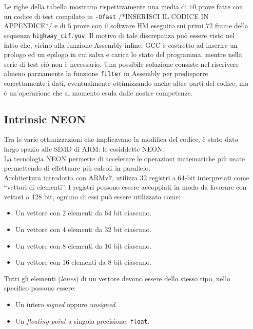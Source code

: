 Le righe della tabella mostrano rispettivamente una media di $10$ prove
fatte con un 
codice di test 
compilato in \verb|-Ofast| /*INSERISCI IL CODICE IN APPENDICE*/ e di $5$ prove 
con il software HM eseguito sui primi $72$ 
frame 
della sequenza \verb|highway_cif.yuv|.\newline
Il motivo di tale discrepanza può essere visto 
nel fatto che, vicino alla funzione Assembly inline, GCC è costretto ad 
inserire un prologo ed un epilogo in cui salva e carica lo stato del programma, 
mentre nella serie di test ciò non è necessario.\newline
Una possibile soluzione consiste nel riscrivere almeno parziamente la funzione 
\verb|filter| 
in Assembly per predisporre correttamente i dati, eventualmente
ottimizzando anche altre parti del codice, ma è un'operazione che al momento 
esula dalle nostre competenze.


\subsection{Intrinsic NEON}

Tra le varie ottimizzazioni che implicavano la modifica del codice, è stato 
dato largo spazio alle SIMD di ARM: le cosiddette NEON.\\
La tecnologia NEON permette di accelerare le operazioni matematiche più usate 
permettendo di effettuare più calcoli in parallelo.\\
Architettura introdotta con ARMv7, utilizza 32 registri a 64-bit interpretati 
come ``vettori di elementi''. I registri possono essere accoppiati in modo da 
lavorare con vettori a 128 bit, ognuno di essi può essere utilizzato come:

\begin{itemize}
  \item Un vettore con 2 elementi da 64 bit ciascuno.
  \item Un vettore con 4 elementi da 32 bit ciascuno.
  \item Un vettore con 8 elementi da 16 bit ciascuno.
  \item Un vettore con 16 elementi da 8 bit ciascuno.
\end{itemize}

Tutti gli elementi (\emph{lanes}) di un vettore devono essere dello stesso 
tipo, nello specifico possono essere:

\begin{itemize}
  \item Un intero \emph{signed} oppure \emph{unsigned}.
  \item Un \emph{floating-point} a singola precisione: \verb|float|.
\end{itemize}

